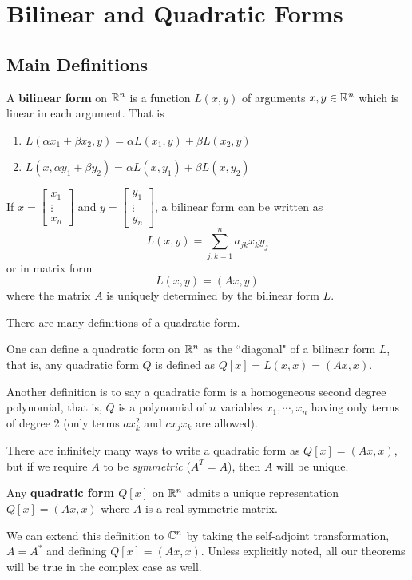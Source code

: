 \chapter{Bilinear and Quadratic Forms}

\section{Main Definitions}

\begin{definition}
A \textbf{bilinear form} on $\mathbb{R}^{n}$ is a function $L(x, y)$ of arguments $x, y \in \mathbb{R}^{n}$ which is linear in each argument. That is 
\begin{enumerate}
	\item $L(\alpha x_{1} + \beta x_{2}, y) = \alpha L(x_{1}, y) + \beta L(x_{2}, y)$
	\item $L(x, \alpha y_{1} + \beta y_{2}) = \alpha L(x, y_{1}) + \beta L(x, y_{2})$
\end{enumerate}

If $x = \begin{bmatrix}
x_{1} \\
\vdots \\
x_{n}
\end{bmatrix}$ and $y = \begin{bmatrix}
y_{1} \\
\vdots \\
y_{n}
\end{bmatrix}$, a bilinear form can be written as 
$$L(x, y) = \sum_{j, k = 1}^{n} a_{jk} x_{k} y_{j}$$
or in matrix form 
$$L(x, y) = (Ax, y)$$
where the matrix $A$ is uniquely determined by the bilinear form $L$.
\end{definition}

\begin{definition}
There are many definitions of a quadratic form. 

One can define a quadratic form on $\mathbb{R}^{n}$ as the ``diagonal" of a bilinear form $L$, that is, any quadratic form $Q$ is defined as $Q[x] = L(x, x) = (Ax, x)$. 

Another definition is to say a quadratic form is a homogeneous second degree polynomial, that is, $Q$ is a polynomial of $n$ variables $x_{1}, \cdots, x_{n}$ having only terms of degree 2 (only terms $ax_{k}^{2}$ and $cx_{j} x_{k}$ are allowed).

There are infinitely many ways to write a quadratic form as $Q[x] = (Ax, x)$, but if we require $A$ to be \textit{symmetric} ($A^{T} = A$), then $A$ will be unique. 

Any \textbf{quadratic form $Q[x]$} on $\mathbb{R}^{n}$ admits a unique representation $Q[x] = (Ax, x)$ where $A$ is a real symmetric matrix. 

We can extend this definition to $\mathbb{C}^{n}$ by taking the self-adjoint transformation, $A = A^{*}$ and defining $Q[x] = (Ax, x)$. Unless explicitly noted, all our theorems will be true in the complex case as well. 

\end{definition}


